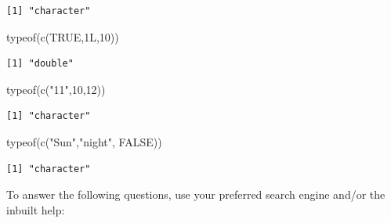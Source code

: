 \documentclass[
  letterpaper,
  DIV=11,
  numbers=noendperiod]{scrartcl}
\newenvironment{Shaded}{\begin{snugshade}}{\end{snugshade}}
\newcommand{\ConstantTok}[1]{\textcolor[rgb]{0.56,0.35,0.01}{#1}}
\newcommand{\DecValTok}[1]{\textcolor[rgb]{0.68,0.00,0.00}{#1}}
\newcommand{\FunctionTok}[1]{\textcolor[rgb]{0.28,0.35,0.67}{#1}}
\newcommand{\NormalTok}[1]{\textcolor[rgb]{0.00,0.23,0.31}{#1}}
\newcommand{\StringTok}[1]{\textcolor[rgb]{0.13,0.47,0.30}{#1}}
\begin{document}
\begin{verbatim}
[1] "character"
\end{verbatim}

\begin{Shaded}
\begin{Highlighting}[]
\FunctionTok{typeof}\NormalTok{(}\FunctionTok{c}\NormalTok{(}\ConstantTok{TRUE}\NormalTok{,1L,}\DecValTok{10}\NormalTok{))}
\end{Highlighting}
\end{Shaded}

\begin{verbatim}
[1] "double"
\end{verbatim}

\begin{Shaded}
\begin{Highlighting}[]
\FunctionTok{typeof}\NormalTok{(}\FunctionTok{c}\NormalTok{(}\StringTok{"11"}\NormalTok{,}\DecValTok{10}\NormalTok{,}\DecValTok{12}\NormalTok{))}
\end{Highlighting}
\end{Shaded}

\begin{verbatim}
[1] "character"
\end{verbatim}

\begin{Shaded}
\begin{Highlighting}[]
\FunctionTok{typeof}\NormalTok{(}\FunctionTok{c}\NormalTok{(}\StringTok{"Sun"}\NormalTok{,}\StringTok{"night"}\NormalTok{, }\ConstantTok{FALSE}\NormalTok{))}
\end{Highlighting}
\end{Shaded}

\begin{verbatim}
[1] "character"
\end{verbatim}

To answer the following questions, use your preferred search engine
and/or the inbuilt help:
\end{document}

